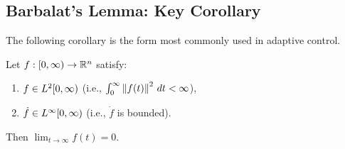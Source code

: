 \subsection{Barbalat's Lemma: Key Corollary}

The following corollary is the form most commonly used in adaptive control.

\begin{corollary}
\label{cor:barbalat_L2}
Let $f: [0,\infty) \to \mathbb{R}^n$ satisfy:
\begin{enumerate}
    \item $f \in L^{2}[0,\infty)$ (i.e., $\int_0^\infty \left\| f(t) \right\|^2 \, dt < \infty$),
    \item $\dot{f} \in L^{\infty}[0,\infty)$ (i.e., $\dot{f}$ is bounded).
\end{enumerate}
Then $\lim_{t \to \infty} f(t) = 0$.
\end{corollary}

